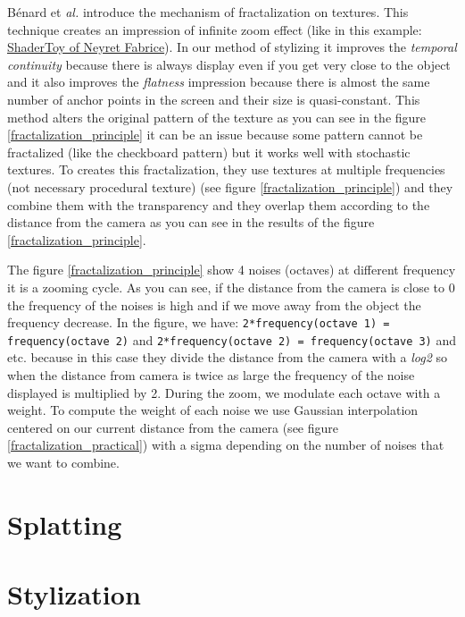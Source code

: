 Bénard et \textit{al.}\cite{benard_dynamic_2010} introduce the mechanism of fractalization on textures. This technique creates an impression of infinite zoom effect (like in this example: \href{https://www.shadertoy.com/view/XlBXWw?fbclid=IwAR1fU2JxQzXtks1ZcmVmzrHiv646G8w2gWceeiV-UToeFkAFMQ2NecbsGGs}{ShaderToy of Neyret Fabrice}). In our method of stylizing it improves the \textit{temporal continuity} because there is always display even if you get very close to the object and it also improves the \textit{flatness} impression because there is almost the same number of anchor points in the screen and their size is quasi-constant. This method alters the original pattern of the texture as you can see in the figure \ref{fractalization_principle} it can be an issue because some pattern cannot be fractalized (like the checkboard pattern) but it works well with stochastic textures. To creates this fractalization, they use textures at multiple frequencies (not necessary procedural texture) (see figure \ref{fractalization_principle}) and they combine them with the transparency and they overlap them according to the distance from the camera as you can see in the results of the figure \ref{fractalization_principle}. \newline


The figure \ref{fractalization_principle} show 4 noises (octaves) at different frequency it is a zooming cycle. As you can see, if the distance from the camera is close to 0 the frequency of the noises is high and if we move away from the object the frequency decrease. In the figure, we have: \texttt{2*frequency(octave 1) = frequency(octave 2)} and \texttt{2*frequency(octave 2) = frequency(octave 3)} and etc.  because in this case they divide the distance from the camera with a \textit{log2} so when the distance from camera is twice as large the frequency of the noise displayed is multiplied by 2. During the zoom, we modulate each octave with a weight. To compute the weight of each noise we use Gaussian interpolation centered on our current distance from the camera (see figure \ref{fractalization_practical}) with a sigma depending on the number of noises that we want to combine.








\section{Splatting}


\section{Stylization}
